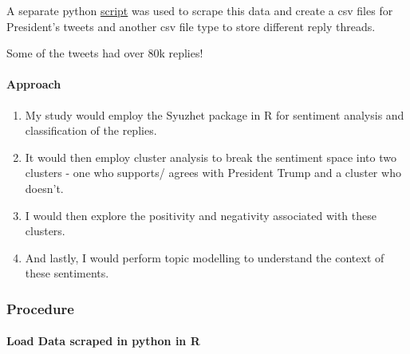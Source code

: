 \documentclass[
]{article}
\providecommand{\tightlist}{%
  \setlength{\itemsep}{0pt}\setlength{\parskip}{0pt}}
\begin{document}
A separate python
\href{https://github.com/Sandeep-Joshi/twitter_api/blob/main/TwitterUsers.py}{script}
was used to scrape this data and create a csv files for President's
tweets and another csv file type to store different reply threads.

Some of the tweets had over 80k replies!

\hypertarget{approach}{%
\paragraph{Approach}\label{approach}}

\begin{enumerate}
\def\labelenumi{\arabic{enumi}.}
\tightlist
\item
  My study would employ the Syuzhet package in R for sentiment analysis
  and classification of the replies.
\item
  It would then employ cluster analysis to break the sentiment space
  into two clusters - one who supports/ agrees with President Trump and
  a cluster who doesn't.
\item
  I would then explore the positivity and negativity associated with
  these clusters.
\item
  And lastly, I would perform topic modelling to understand the context
  of these sentiments.
\end{enumerate}

\hypertarget{procedure}{%
\subsubsection{Procedure}\label{procedure}}

\hypertarget{load-data-scraped-in-python-in-r}{%
\paragraph{Load Data scraped in python in
R}\label{load-data-scraped-in-python-in-r}}
\end{document}
